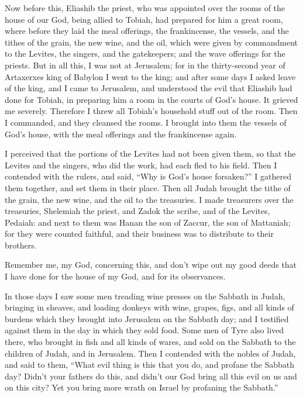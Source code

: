 \myverse{}Now before this, Eliashib the priest, who was appointed over the
rooms of the house of our God, being allied to Tobiah,
\myverse{}had prepared for him a great room, where before they laid the meal offerings,
the frankincense, the vessels, and the tithes of the grain, the new wine, and the oil, which were given
by commandment to the Levites, the singers, and the gatekeepers; and the wave offerings for the priests.
\myverse{}But in all this, I was not at Jerusalem; for in the thirty-second year of Artaxerxes
king of Babylon I went to the king; and after some days I asked leave of the king,
\myverse{}and I came to Jerusalem, and understood the evil that Eliashib had done for
Tobiah, in preparing him a room in the courts of God’s house.
\myverse{}It grieved me severely. Therefore I threw all Tobiah’s household stuff out
of the room.
\myverse{}Then I commanded, and they cleansed the rooms. I brought into them the vessels
of God’s house, with the meal offerings and the frankincense again.

\myverse{}I perceived that the portions of the Levites had not been given
them, so that the Levites and the singers, who did the work, had each fled to his field.
\myverse{}Then I contended with the rulers, and said, “Why is God’s house forsaken?”
I gathered them together, and set them in their place.
\myverse{}Then all Judah brought the tithe of the grain, the new wine, and the oil
to the treasuries.
\myverse{}I made treasurers over the treasuries, Shelemiah the priest, and Zadok the
scribe, and of the Levites, Pedaiah: and next to them was Hanan the son of Zaccur, the son of Mattaniah;
for they were counted faithful, and their business was to distribute to their brothers.

\myverse{}Remember me, my God, concerning this, and don’t wipe out my
good deeds that I have done for the house of my God, and for its observances.

\myverse{}In those days I saw some men treading wine presses on the Sabbath
in Judah, bringing in sheaves, and loading donkeys with wine, grapes, figs, and all kinds of burdens which
they brought into Jerusalem on the Sabbath day; and I testified against them in the day in which they
sold food.
\myverse{}Some men of Tyre also lived there, who brought in fish and all kinds of wares,
and sold on the Sabbath to the children of Judah, and in Jerusalem.
\myverse{}Then I contended with the nobles of Judah, and said to them, “What evil thing
is this that you do, and profane the Sabbath day?
\myverse{}Didn’t your fathers do this, and didn’t our God bring all this evil on us
and on this city? Yet you bring more wrath on Israel by profaning the Sabbath.”

